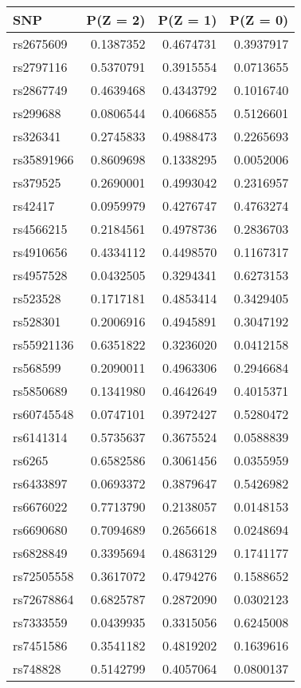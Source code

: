 \documentclass[AMA,STIX1COL,]{WileyNJD-v2}
\begin{document}
\begin{table}[ht]
\begin{minipage}{0.5\linewidth}
\begin{tabular}{lrrr}
\toprule
SNP & P(Z = 2) & P(Z = 1) & P(Z = 0)\\
\midrule
rs2675609 & 0.1387352 & 0.4674731 & 0.3937917\\
rs2797116 & 0.5370791 & 0.3915554 & 0.0713655\\
rs2867749 & 0.4639468 & 0.4343792 & 0.1016740\\
rs299688 & 0.0806544 & 0.4066855 & 0.5126601\\
rs326341 & 0.2745833 & 0.4988473 & 0.2265693\\
\addlinespace
rs35891966 & 0.8609698 & 0.1338295 & 0.0052006\\
rs379525 & 0.2690001 & 0.4993042 & 0.2316957\\
rs42417 & 0.0959979 & 0.4276747 & 0.4763274\\
rs4566215 & 0.2184561 & 0.4978736 & 0.2836703\\
rs4910656 & 0.4334112 & 0.4498570 & 0.1167317\\
\addlinespace
rs4957528 & 0.0432505 & 0.3294341 & 0.6273153\\
rs523528 & 0.1717181 & 0.4853414 & 0.3429405\\
rs528301 & 0.2006916 & 0.4945891 & 0.3047192\\
rs55921136 & 0.6351822 & 0.3236020 & 0.0412158\\
rs568599 & 0.2090011 & 0.4963306 & 0.2946684\\
\addlinespace
rs5850689 & 0.1341980 & 0.4642649 & 0.4015371\\
rs60745548 & 0.0747101 & 0.3972427 & 0.5280472\\
rs6141314 & 0.5735637 & 0.3675524 & 0.0588839\\
rs6265 & 0.6582586 & 0.3061456 & 0.0355959\\
rs6433897 & 0.0693372 & 0.3879647 & 0.5426982\\
\addlinespace
rs6676022 & 0.7713790 & 0.2138057 & 0.0148153\\
rs6690680 & 0.7094689 & 0.2656618 & 0.0248694\\
rs6828849 & 0.3395694 & 0.4863129 & 0.1741177\\
rs72505558 & 0.3617072 & 0.4794276 & 0.1588652\\
rs72678864 & 0.6825787 & 0.2872090 & 0.0302123\\
\addlinespace
rs7333559 & 0.0439935 & 0.3315056 & 0.6245008\\
rs7451586 & 0.3541182 & 0.4819202 & 0.1639616\\
rs748828 & 0.5142799 & 0.4057064 & 0.0800137\\

\end{tabular}
\end{minipage}
\end{table}
\end{document}

